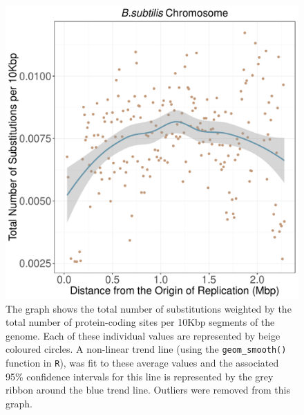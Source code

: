 \documentclass[11pt]{article}
\begin{document}
\begin{figure}[h]
	\begin{center}
		\includegraphics[width=\textwidth]{./figs/bass_10KB_weighted_subs_nonpar_12Sep20.pdf}
		\caption{\label{fig:bass_nonpar}The graph shows the total number of substitutions weighted by the total number of protein-coding sites per 10Kbp segments of the genome. Each of these individual values are represented by beige coloured circles. A non-linear trend line (using the \texttt{geom\_smooth()} function in \texttt{R}), was fit to these average values and the associated 95\% confidence intervals for this line is represented by the grey ribbon around the blue trend line. Outliers were removed from this graph.}
	\end{center}
\end{figure}
\end{document}
